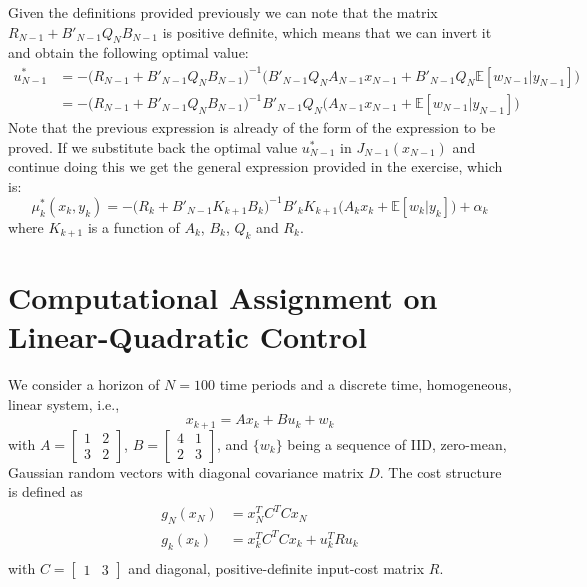 \documentclass[11pt, oneside]{article}   	%
\begin{document}
Given the definitions provided previously we can note that the matrix $R_{N-1} + B'_{N-1}Q_{N}B_{N-1}$ is positive definite, which means that we can invert it and obtain the following optimal value:
\begin{align*}
u_{N-1}^{*} &= - \big(R_{N-1} + B'_{N-1}Q_{N}B_{N-1}\big)^{-1}\big(B'_{N-1}Q_{N}A_{N-1}x_{N-1} + B'_{N-1}Q_{N} \mathbb{E}[w_{N-1}|y_{N-1}]\big)\\
&= - \big(R_{N-1} + B'_{N-1}Q_{N}B_{N-1}\big)^{-1}B'_{N-1}Q_{N}\big(A_{N-1}x_{N-1} +\mathbb{E}[w_{N-1}|y_{N-1}]\big)
\end{align*}
Note that the previous expression is already of the form of the expression to be proved. If we substitute back the optimal value $u_{N-1}^{*}$ in $J_{N-1}(x_{N-1})$ and continue doing this we get the general expression provided in the exercise, which is:
$$\mu_{k}^{*}(x_{k},y_{k}) = - \big(R_{k} + B'_{N-1}K_{k+1}B_{k}\big)^{-1}B'_{k}K_{k+1}\big(A_{k}x_{k} + \mathbb{E}[w_{k}|y_{k}]\big) + \alpha_{k}$$
where $K_{k+1}$ is a function of $A_{k}$, $B_{k}$, $Q_{k}$ and $R_{k}$.

\newpage
\section{Computational Assignment on Linear-Quadratic Control}
We consider a horizon of $N=100$ time periods and a discrete time, homogeneous, linear system, i.e.,
$$ x_{k+1} = A x_k + B u_k + w_k$$
with $A = \begin{bmatrix} 1 & 2 \\[0.3em] 3 & 2 \end{bmatrix}$,
       $B = \begin{bmatrix} 4 & 1 \\[0.3em] 2 & 3 \end{bmatrix}$,
and $\{w_k\}$ being a sequence of IID, zero-mean, Gaussian random vectors with diagonal covariance matrix $D$. 
The cost structure is defined as 
\begin{align*}
g_{N}(x_{N}) &= x_N^T C^T C x_N\\
g_{k}(x_{k}) &= x_k^T C^T C x_k + u_k^T R u_k\\
\end{align*}
with $C = \begin{bmatrix} 1 & 3 \end{bmatrix}$ and diagonal, positive-definite input-cost matrix $R$.
\end{document}
